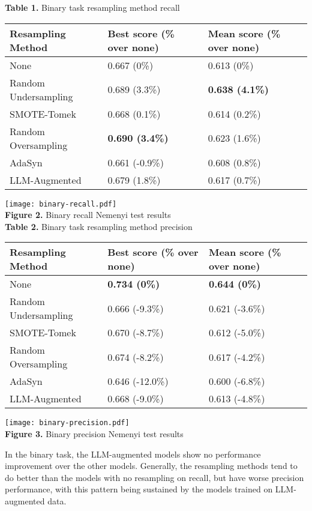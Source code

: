\documentclass[runningheads]{llncs}
\newenvironment{nscenter}
 {\parskip=0pt\par\nopagebreak\centering}
 {\par\noindent\ignorespacesafterend}
\begin{document}
\begin{nscenter}
{\bf Table 1.} Binary task resampling method recall\\

\begin{tabular}{|l|l|l|}
\hline
Resampling Method & Best score (\% over none) & Mean score (\% over none) \\\hline
None & 0.667 (0\%) & 0.613 (0\%) \\\hline
Random Undersampling & 0.689 (3.3\%) & {\bf 0.638 (4.1\%)} \\\hline
SMOTE-Tomek & 0.668 (0.1\%) & 0.614 (0.2\%) \\\hline
Random Oversampling & {\bf 0.690 (3.4\%)} & 0.623 (1.6\%) \\\hline
AdaSyn & 0.661 (-0.9\%) & 0.608 (0.8\%) \\\hline
LLM-Augmented & 0.679 (1.8\%) & 0.617 (0.7\%) \\\hline
\end{tabular}

\texttt{[image: binary-recall.pdf]}\\
{\bf Figure 2.} Binary recall Nemenyi test results\\
\vspace{\baselineskip}
{\bf Table 2.} Binary task resampling method precision\\

\begin{tabular}{|l|l|l|}
\hline
Resampling Method & Best score (\% over none) & Mean score (\% over none) \\\hline
None & {\bf 0.734 (0\%)} & {\bf 0.644 (0\%)} \\\hline
Random Undersampling & 0.666 (-9.3\%) & 0.621 (-3.6\%) \\\hline
SMOTE-Tomek & 0.670 (-8.7\%) & 0.612 (-5.0\%) \\\hline
Random Oversampling & 0.674 (-8.2\%) & 0.617 (-4.2\%) \\\hline
AdaSyn & 0.646 (-12.0\%) & 0.600 (-6.8\%) \\\hline
LLM-Augmented & 0.668 (-9.0\%) & 0.613 (-4.8\%) \\\hline
\end{tabular}

\texttt{[image: binary-precision.pdf]}\\
{\bf Figure 3.} Binary precision Nemenyi test results
\end{nscenter}
In the binary task, the LLM-augmented models show no performance improvement over the other models. Generally, the resampling methods tend to do better than the models with no resampling on recall, but have worse precision performance, with this pattern being sustained by the models trained on LLM-augmented data.
\end{document}
